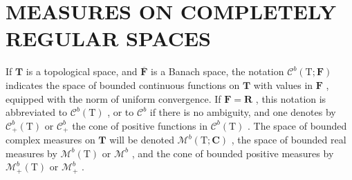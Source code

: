 \section{MEASURES ON COMPLETELY REGULAR SPACES}

If \(\mathbf{T}\) is a topological space, and \(\overline{\mathbf{F}}\) is a Banach space, the notation \(\mathcal{C}^b (\mathrm{T};\mathbf{F})\) indicates the space of bounded continuous functions on \(\mathbf{T}\) with values in \(\mathbf{F}\) , equipped with the norm of uniform convergence. If \(\mathbf{F} = \mathbf{R}\) , this notation is abbreviated to \(\mathcal{C}^b (\mathrm{T})\) , or to \(\mathcal{C}^b\) if there is no ambiguity, and one denotes by \(\mathcal{C}_+^b (\mathrm{T})\) or \(\mathcal{C}_+^b\) the cone of positive functions in \(\mathcal{C}^b (\mathrm{T})\) . The space of bounded complex measures on \(\mathbf{T}\) will be denoted \(\mathcal{M}^b (\mathrm{T};\mathbf{C})\) , the space of bounded real measures by \(\mathcal{M}^b (\mathrm{T})\) or \(\mathcal{M}^b\) , and the cone of bounded positive measures by \(\mathcal{M}_+^b (\mathrm{T})\) or \(\mathcal{M}_+^b\) .

